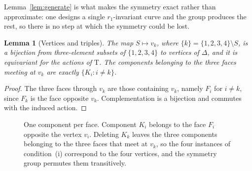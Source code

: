 \documentclass[11pt,a4paper]{article}
\theoremstyle{plain}
\newtheorem{lemma}[theorem]{Lemma}
\theoremstyle{definition}
\newcommand{\Tet}{\mathrm{T}}
\begin{document}
Lemma~\ref{lem:generate} is what makes the symmetry exact rather than
approximate: one designs a single $r_1$-invariant curve and the group produces
the rest, so there is no step at which the symmetry could be lost.

\begin{lemma}[Vertices and triples]\label{lem:vertices}
The map $S\mapsto v_k$, where $\{k\}=\{1,2,3,4\}\setminus S$, is a bijection
from three-element subsets of $\{1,2,3,4\}$ to vertices of $\Delta$, and it is
equivariant for the actions of $\Tet$. The components belonging to the three
faces meeting at $v_k$ are exactly $\{K_i : i\neq k\}$.
\end{lemma}

\begin{proof}
The three faces through $v_k$ are those containing $v_k$, namely $F_i$ for
$i\neq k$, since $F_k$ is the face opposite $v_k$. Complementation is a
bijection and commutes with the induced action.
\end{proof}

\begin{figure}[htbp]
\centering
{}
\hspace{1.1cm}
\caption{One component per face. Component $K_i$ belongs to the face $F_i$
opposite the vertex $v_i$. Deleting $K_k$ leaves the three components belonging
to the three faces that meet at $v_k$, so the four instances of condition~(i)
correspond to the four vertices, and the symmetry group permutes them
transitively.}
\label{fig:tetra}
\end{figure}
\end{document}
